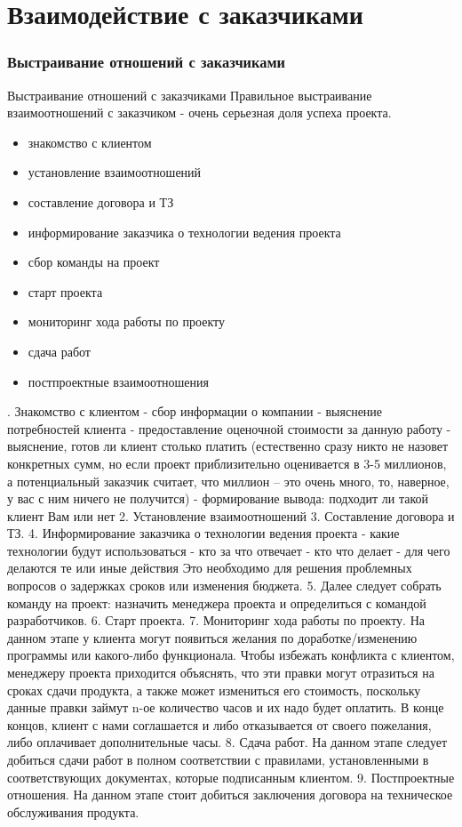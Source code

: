 \documentclass{../industrial-development}
\begin{document}
\section{Взаимодействие с заказчиками}

\begin{frame} \frametitle{Выстраивание отношений с заказчиками}
  \begin{block}{Выстраивание отношений с заказчиками}
Правильное выстраивание взаимоотношений с заказчиком - очень серьезная доля успеха проекта. 
  \end{block}

\begin{itemize}
 \item знакомство с клиентом
 \item установление взаимоотношений
 \item составление договора и ТЗ
 \item информирование заказчика о технологии ведения проекта
 \item сбор команды на проект 
 \item старт проекта 
 \item мониторинг хода работы по проекту
 \item сдача работ
 \item постпроектные взаимоотношения
  \end{itemize}
\end{frame}

. Знакомство с клиентом
  - сбор информации о компании
  -  выяснение потребностей клиента
  - предоставление оценочной стоимости за данную работу
 -  выяснение, готов ли клиент столько платить (естественно сразу никто не назовет конкретных сумм, но если проект приблизительно оценивается в 3-5 миллионов, а потенциальный заказчик считает, что миллион –  это очень много, то, наверное, у вас с ним ничего не получится)
  - формирование вывода: подходит ли такой клиент Вам или нет
2. Установление взаимоотношений
3. Составление договора и ТЗ.
4. Информирование заказчика о технологии ведения проекта
 - какие технологии будут использоваться
 - кто за что отвечает
 - кто что делает
 - для чего делаются те или иные действия
 Это необходимо для решения проблемных вопросов о задержках сроков или изменения бюджета.
5. Далее следует собрать команду на проект: назначить менеджера проекта и определиться с командой разработчиков.
6. Старт проекта.
7. Мониторинг хода работы по проекту. 
На данном этапе у клиента могут появиться желания по доработке/изменению программы или какого-либо функционала. Чтобы избежать конфликта с клиентом, менеджеру проекта приходится объяснять, что эти правки могут отразиться на сроках сдачи продукта, а также может измениться его стоимость, поскольку данные правки займут n-ое количество часов и их надо будет оплатить. В конце концов, клиент с нами соглашается и либо отказывается от своего пожелания, либо оплачивает дополнительные часы. 
8. Сдача работ.
На данном этапе следует добиться сдачи работ в полном соответствии с правилами, установленными в соответствующих документах, которые подписанным клиентом.
9. Постпроектные отношения. 
На данном этапе стоит добиться заключения договора на техническое обслуживания продукта.
\end{document}
